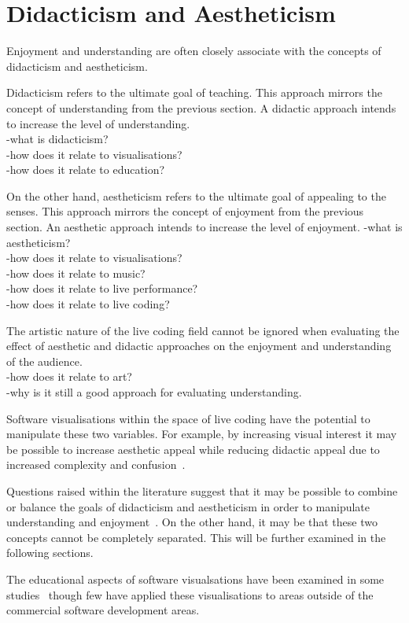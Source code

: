 \section{Didacticism and Aestheticism}

Enjoyment and understanding are often closely associate with the concepts of didacticism and aestheticism.

Didacticism refers to the ultimate goal of teaching. This approach mirrors the concept of understanding from the previous section. A didactic approach intends to increase the level of understanding.\\
-what is didacticism?\\
-how does it relate to visualisations?\\
-how does it relate to education?

On the other hand, aestheticism refers to the ultimate goal of appealing to the senses. This approach mirrors the concept of enjoyment from the previous section. An aesthetic approach intends to increase the level of enjoyment.
-what is aestheticism?\\
-how does it relate to visualisations?\\
-how does it relate to music?\\
-how does it relate to live performance?\\
-how does it relate to live coding? \cite{Bell}

The artistic nature of the live coding field cannot be ignored when evaluating the effect of aesthetic and didactic approaches on the enjoyment and understanding of the audience.\\
-how does it relate to art?\\
-why is it still a good approach for evaluating understanding.

Software visualisations within the space of live coding have the potential to manipulate these two variables. For example, by increasing visual interest it may be possible to increase aesthetic appeal while reducing didactic appeal due to increased complexity and confusion~.

Questions raised within the literature suggest that it may be possible to combine or balance the goals of didacticism and aestheticism in order to manipulate understanding and enjoyment~. On the other hand, it may be that these two concepts cannot be completely separated. This will be further examined in the following sections.

The educational aspects of software visualsations have been examined in some studies~ though few have applied these visualisations to areas outside of the commercial software development areas.

